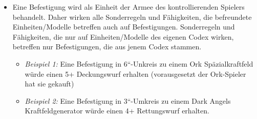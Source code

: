\begin{itemize}

 \item Eine Befestigung wird als Einheit der Armee des kontrollierenden Spielers
  behandelt. Daher wirken alle Sonderregeln und Fähigkeiten, die befreundete
  Einheiten/Modelle betreffen auch auf Befestigungen.
Sonderregeln und Fähigkeiten, die nur auf Einheiten/Modelle des eigenen Codex
wirken, betreffen nur Befestigungen, die aus jenem Codex stammen.
\begin{itemize}
 \item \textit{Beispiel 1:} Eine Befestigung in 6“-Unkreis zu einem Ork
  Späzialkraftfeld würde einen 5+ Deckungswurf erhalten (vorausgesetzt der
  Ork-Spieler hat sie gekauft)
 \item \textit{Beispiel 2:} Eine Befestigung in 3“-Umkreis zu einem Dark Angels
  Kraftfeldgenerator würde einen 4+ Rettungswurf erhalten.
\end{itemize}


\end{itemize}
